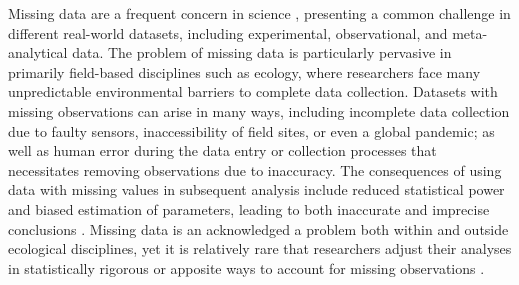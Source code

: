 \documentclass{article}
\begin{document}
Missing data are a frequent concern in science \citep{rubin_inference_1976, mcknight_missing_2007,allison_missing_2002,little_statistical_2002}, presenting a common challenge in different real-world datasets, including experimental, observational, and meta-analytical data. The problem of missing data is particularly pervasive in primarily field-based disciplines such as ecology, where researchers face many unpredictable environmental barriers to complete data collection\citep{lopucki2022handling, nakagawa_missing_2008}. Datasets with missing observations can arise in many ways, including incomplete data collection due to faulty sensors, inaccessibility of field sites, or even a global pandemic; as well as human error during the data entry or collection processes that necessitates removing observations due to inaccuracy. The consequences of using  data with missing values in subsequent analysis include reduced statistical power \citep{kang2013prevention, moritz_imputets_2017} and biased estimation of parameters, leading to both inaccurate and imprecise conclusions \citep{aleryani2018dealing, kim_transcending_2018, junger_imputation_2015}.%
Missing data is an acknowledged a problem both within and outside ecological disciplines, yet it is relatively rare that researchers adjust their analyses in statistically rigorous or apposite ways to account for missing observations \citep{nakagawa_missing_2015, junger_imputation_2015, velicer2005comparison}. 
\end{document}
